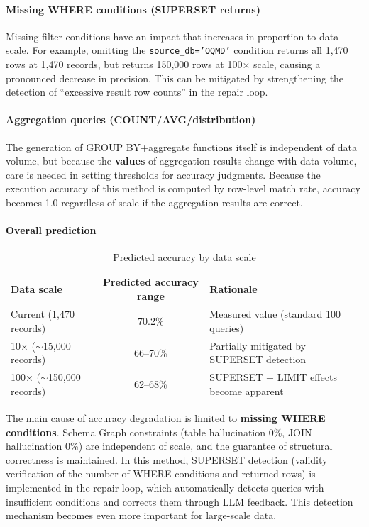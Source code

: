 \documentclass[5p,twocolumn]{elsarticle}
\begin{document}
\paragraph{Missing WHERE conditions (SUPERSET returns)}
Missing filter conditions have an impact that increases in proportion to data scale.
For example, omitting the \texttt{source\_db='OQMD'} condition
returns all 1{,}470 rows at 1{,}470 records,
but returns 150{,}000 rows at 100$\times$ scale, causing a pronounced decrease in precision.
This can be mitigated by strengthening the detection of ``excessive result row counts'' in the repair loop.

\paragraph{Aggregation queries (COUNT/AVG/distribution)}
The generation of GROUP BY+aggregate functions itself is independent of data volume,
but because the \textbf{values} of aggregation results change with data volume,
care is needed in setting thresholds for accuracy judgments.
Because the execution accuracy of this method is computed by row-level match rate,
accuracy becomes 1.0 regardless of scale if the aggregation results are correct.

\paragraph{Overall prediction}

\begin{table}[h]
\centering
\caption{Predicted accuracy by data scale}
\label{tab:scale_accuracy}
\begin{tabular}{lcl}
\hline
Data scale & Predicted accuracy range & Rationale \\
\hline
Current (1{,}470 records) & 70.2\% & Measured value (standard 100 queries) \\
10$\times$ (${\sim}$15{,}000 records) & 66--70\% & Partially mitigated by SUPERSET detection \\
100$\times$ (${\sim}$150{,}000 records) & 62--68\% & SUPERSET + LIMIT effects become apparent \\
\hline
\end{tabular}
\end{table}

The main cause of accuracy degradation is limited to \textbf{missing WHERE conditions}.
Schema Graph constraints (table hallucination 0\%, JOIN hallucination 0\%) are independent of scale,
and the guarantee of structural correctness is maintained.
In this method, SUPERSET detection (validity verification of the number of WHERE conditions and returned rows) is implemented in the repair loop,
which automatically detects queries with insufficient conditions and corrects them through LLM feedback.
This detection mechanism becomes even more important for large-scale data.
\end{document}
